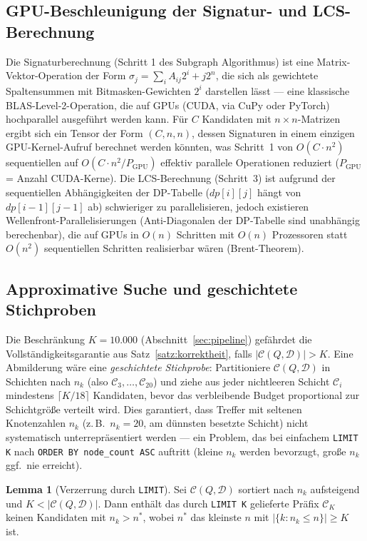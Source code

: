 \documentclass[a4paper,12pt]{article}
\theoremstyle{definition}
\newtheorem{lemma}{Lemma}
\begin{document}
\subsection{GPU-Beschleunigung der Signatur- und LCS-Berechnung}

Die Signaturberechnung (Schritt 1 des Subgraph Algorithmus) ist eine Matrix-Vektor-Operation der Form $\sigma_j = \sum_i A_{ij}2^i + j2^n$, die sich als gewichtete Spaltensummen mit Bitmasken-Gewichten $2^i$ darstellen lässt — eine klassische BLAS-Level-2-Operation, die auf GPUs (CUDA, via CuPy oder PyTorch) hochparallel ausgeführt werden kann. Für $C$ Kandidaten mit $n\times n$-Matrizen ergibt sich ein Tensor der Form $(C,n,n)$, dessen Signaturen in einem einzigen GPU-Kernel-Aufruf berechnet werden könnten, was Schritt~1 von $O(C\cdot n^2)$ sequentiellen auf $O(C\cdot n^2 / P_{\mathrm{GPU}})$ effektiv parallele Operationen reduziert ($P_{\mathrm{GPU}}$ = Anzahl CUDA-Kerne). Die LCS-Berechnung (Schritt~3) ist aufgrund der sequentiellen Abhängigkeiten der DP-Tabelle ($dp[i][j]$ hängt von $dp[i-1][j-1]$ ab) schwieriger zu parallelisieren, jedoch existieren Wellenfront-Parallelisierungen (Anti-Diagonalen der DP-Tabelle sind unabhängig berechenbar), die auf GPUs in $O(n)$ Schritten mit $O(n)$ Prozessoren statt $O(n^2)$ sequentiellen Schritten realisierbar wären (Brent-Theorem).

\subsection{Approximative Suche und geschichtete Stichproben}

Die Beschränkung $K=10.000$ (Abschnitt~\ref{sec:pipeline}) gefährdet die Vollständigkeitsgarantie aus Satz~\ref{satz:korrektheit}, falls $|\mathcal{C}(Q,\mathcal{D})|>K$. Eine Abmilderung wäre eine \emph{geschichtete Stichprobe}: Partitioniere $\mathcal{C}(Q,\mathcal{D})$ in Schichten nach $n_k$ (also $\mathcal{C}_3,\ldots,\mathcal{C}_{20}$) und ziehe aus jeder nichtleeren Schicht $\mathcal{C}_i$ mindestens $\lceil K/18\rceil$ Kandidaten, bevor das verbleibende Budget proportional zur Schichtgröße verteilt wird. Dies garantiert, dass Treffer mit seltenen Knotenzahlen $n_k$ (z.\,B.\ $n_k=20$, am dünnsten besetzte Schicht) nicht systematisch unterrepräsentiert werden — ein Problem, das bei einfachem \texttt{LIMIT K} nach \texttt{ORDER BY node\_count ASC} auftritt (kleine $n_k$ werden bevorzugt, große $n_k$ ggf.\ nie erreicht).

\begin{lemma}[Verzerrung durch \texttt{LIMIT}]
	Sei $\mathcal{C}(Q,\mathcal{D})$ sortiert nach $n_k$ aufsteigend und $K < |\mathcal{C}(Q,\mathcal{D})|$. Dann enthält das durch \texttt{LIMIT K} gelieferte Präfix $\mathcal{C}_K$ keinen Kandidaten mit $n_k > n^*$, wobei $n^*$ das kleinste $n$ mit $|\{k:n_k\le n\}|\ge K$ ist.
\end{lemma}
\end{document}
